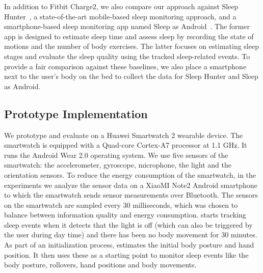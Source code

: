  In addition to Fitbit Charge2, we also compare our approach against Sleep Hunter~\cite{gu2016sleep}, a
state-of-the-art mobile-based sleep monitoring approach, and a smartphone-based sleep monitoring app named Sleep as
Android~\cite{SleepAndroid}. The former app is designed to estimate sleep time and assess sleep by recording the state of motions and the
number of body exercises. The latter focuses on estimating sleep stages and evaluate the sleep quality using the tracked sleep-related
events. To provide a fair comparison against these baselines, we also place a smartphone next to the user's body on the bed to collect the
data for Sleep Hunter and Sleep as Android.
	





\subsection{Prototype Implementation \label{sec:implementation}}
We prototype and evaluate {\systemname} on a Huawei Smartwatch 2 wearable device. The smartwatch is equipped with a Quad-core Cortex-A7
processor at 1.1 GHz. It runs the Android Wear 2.0 operating system. We use five sensors of the smartwatch: the accelerometer, gyroscope,
microphone, the light and the orientation sensors. To reduce the energy consumption of the smartwatch, in the experiments we analyze the
sensor data on a XiaoMI Note2 Android smartphone to which the smartwatch sends sensor measurements over Bluetooth. The sensors on the
smartwatch are sampled every $30$ milliseconds, which was chosen to balance between information quality and energy consumption.
{\systemname} starts tracking sleep events when it detects that the light is off (which can also be triggered by the user during day time)
and there has been no body movement for 30 minutes. As part of an initialization process, {\systemname} estimates the initial body posture
and hand position. It then uses these as a starting point to monitor sleep events like the body posture, rollovers, hand positions and body
movements.
